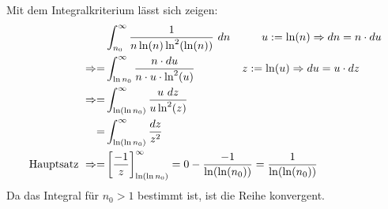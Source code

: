 \documentclass[10pt]{article}
\begin{document}
Mit dem Integralkriterium lässt sich zeigen:
\begin{align*}
	&\int_{n_0}^\infty \frac{1}{n \ln(n) \ln^2(\ln(n))} \ dn 
	\hspace{1cm}
	u := \ln(n) \Rightarrow dn = n \cdot du \\
	\Rightarrow 
	= &\int_{\ln n_0}^\infty \frac{n \cdot du}{n \cdot u \cdot 
	\ln^2(u)} 
	\hspace{1.5cm} z := \ln(u) \Rightarrow du = u \cdot dz \\
	\Rightarrow
	= &\int_{\ln(\ln n_0)}^\infty \frac{u \ dz}{u \ln^2(z)} \\
	= &\int_{\ln(\ln n_0)}^\infty \frac{dz}{z^2} \\
	\text{Hauptsatz } \Rightarrow =
	& \left[\frac{-1}{z} \right]_{\ln(\ln n_0)}^\infty 
	=
	0 - \frac{-1}{\ln(\ln(n_0))} = \frac{1}{\ln(\ln(n_0))}
\end{align*}
Da das Integral für $n_0 > 1$  bestimmt ist, ist die Reihe konvergent.
\end{document}
